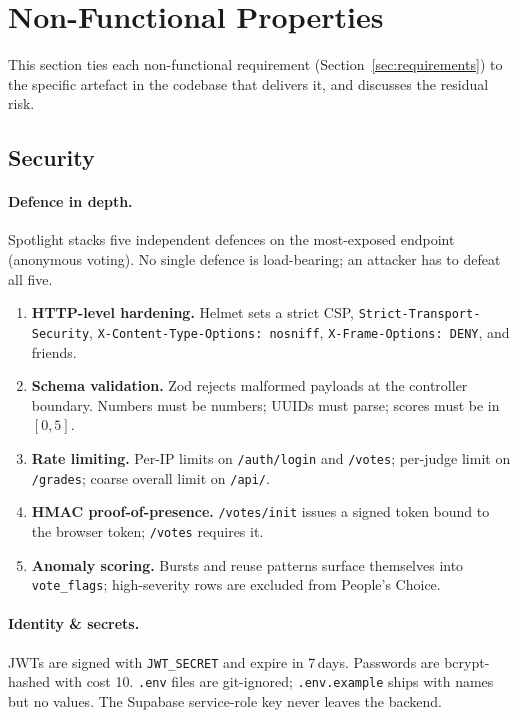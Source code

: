 \section{Non-Functional Properties}
\label{sec:nonfunc}

This section ties each non-functional requirement (Section~\ref{sec:requirements})
to the specific artefact in the codebase that delivers it, and discusses
the residual risk.

\subsection{Security}

\paragraph{Defence in depth.} Spotlight stacks five independent defences
on the most-exposed endpoint (anonymous voting). No single defence is
load-bearing; an attacker has to defeat all five.

\begin{enumerate}[leftmargin=*]
  \item \textbf{HTTP-level hardening.} Helmet sets a strict CSP,
        \texttt{Strict-Transport-Security}, \texttt{X-Content-Type-Options:
        nosniff}, \texttt{X-Frame-Options: DENY}, and friends.
  \item \textbf{Schema validation.} Zod rejects malformed payloads at the
        controller boundary. Numbers must be numbers; UUIDs must parse;
        scores must be in $[0, 5]$.
  \item \textbf{Rate limiting.} Per-IP limits on \texttt{/auth/login} and
        \texttt{/votes}; per-judge limit on \texttt{/grades}; coarse
        overall limit on \texttt{/api/}.
  \item \textbf{HMAC proof-of-presence.} \texttt{/votes/init} issues a
        signed token bound to the browser token; \texttt{/votes} requires
        it.
  \item \textbf{Anomaly scoring.} Bursts and reuse patterns surface
        themselves into \texttt{vote\_flags}; high-severity rows are
        excluded from People's Choice.
\end{enumerate}

\paragraph{Identity \& secrets.} JWTs are signed with
\texttt{JWT\_SECRET} and expire in 7\,days. Passwords are bcrypt-hashed
with cost 10. \texttt{.env} files are git-ignored; \texttt{.env.example}
ships with names but no values. The Supabase service-role key never
leaves the backend.


